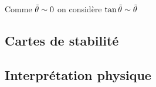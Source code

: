 Comme $\Tilde{\theta} \sim 0$ on considère $\tan{\Tilde{\theta}}\sim \Tilde{\theta}$





\subsection{Cartes de stabilité}

\subsection{Interprétation physique}








































